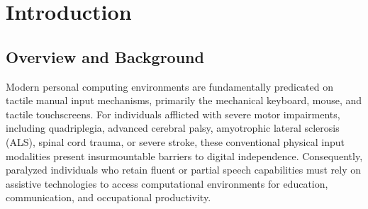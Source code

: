 \documentclass[12pt,a4paper]{report}
\begin{document}
	
\gdef \title{An Independence Platform for Voice-Native OS Navigation by Individuals with Severe Motor Impairment}
\gdef \dept{Computer Science and Engineering}
\gdef \degree{Bachelor of Technology}
\gdef \branch{Computer Science and Engineering}
\gdef \college{SCT College of Engineering}
\gdef \collegeplace{Thiruvananthapuram}
\gdef \studentA{Abhiram A. R.}
\gdef \studentAroll{SCT23CS007}
\gdef \studentB{Kevin L.}
\gdef \studentBroll{SCT23CS037}
\gdef \studentC{Niyatha Suresh R.}
\gdef \studentCroll{SCT23CS051}

\gdef \guide{Prof. Dr. Subu Surendran}
\gdef \guidedes{Professor}

\gdef \projadvisor{Asst. Prof. Binu Rajan M. R.}
\gdef \projadvisordes{Assistant Professor}

\gdef \hod{Assoc. Prof. Rejimol Robinson R. R.}
\gdef \hoddes{Associate Professor and Head}

\gdef \acadyear{2025 - 2026}
\gdef \month{October 2026}
\gdef \date{29-10-2026}









\thispagestyle{empty}
\newpage
    
\tableofcontents
\listoffigures
\listoftables


\cleardoublepage
\setcounter{page}{1}

\chapter{Introduction}
\label{chap:intro}

\section{Overview and Background}
Modern personal computing environments are fundamentally predicated on tactile manual input mechanisms, primarily the mechanical keyboard, mouse, and tactile touchscreens. For individuals afflicted with severe motor impairments, including quadriplegia, advanced cerebral palsy, amyotrophic lateral sclerosis (ALS), spinal cord trauma, or severe stroke, these conventional physical input modalities present insurmountable barriers to digital independence. Consequently, paralyzed individuals who retain fluent or partial speech capabilities must rely on assistive technologies to access computational environments for education, communication, and occupational productivity.
\end{document}
